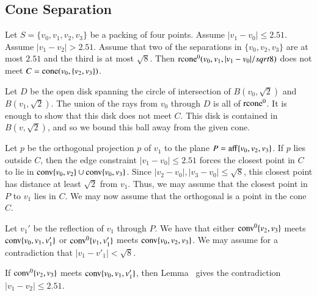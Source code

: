 \begin{tarskidata}
\begin{tarski}
\section{Cone Separation}

\begin{lemma}
Let $S=\{v_0,v_1,v_2,v_3\}$ be a packing of four points.
Assume $|v_1-v_0|\le 2.51$. Assume $|v_1-v_2|>2.51$.
Assume that two of the separations in $\{v_0,v_2,v_3\}$ are at
          most $2.51$ and the third is at most $\sqrt8$.
     Then ${\operatorname{rcone}}^0(v_0,v_1,|v_1-v_0|/sqrt8)$ does not meet
$C = {\operatorname{cone}}(v_0,\{v_2,v_3\})$.
\end{lemma}

\begin{proved}
Let $D$ be the open disk spanning the circle of intersection of
$B(v_0,\sqrt2)$ and $B(v_1,\sqrt2)$.  The union of the rays from $v_0$
through $D$ is all of ${\operatorname{rcone}}^0$.  It is enough to show that this
disk does not meet $C$.  This disk is contained in $B(v,\sqrt2)$,
and so we bound this ball away from the given cone.

Let $p$ be the orthogonal 
projection $p$ of $v_1$ to the plane $P={\operatorname{aff}}\{v_0,v_2,v_3\}$.
If $p$  lies outside $C$, then the
edge constraint $|v_1-v_0|\le 2.51$ forces the closest point in $C$ to
lie in ${\operatorname{conv}}\{v_0,v_2\}\cup{\operatorname{conv}}\{v_0,v_3\}$.  Since
$|v_2-v_0|,|v_3-v_0|\le\sqrt8$, this closest point has distance at least
$\sqrt2$ from $v_1$. Thus, we may assume that the closest point in
$P$ to $v_1$ lies in $C$.
We may now assume that the
orthogonal 
is a point in the
cone $C$.

Let $v_1'$ be the reflection of $v_1$ through $P$.  We
have that either ${\operatorname{conv}}^0\{v_2,v_3\}$ meets ${\operatorname{conv}}\{v_0,v_1,v'_1\}$ or
${\operatorname{conv}}^0\{v_1,v'_1\}$ meets ${\operatorname{conv}}\{v_0,v_2,v_3\}$.  We may assume for
a contradiction that $|v_1-v'_1|<\sqrt8$.

If ${\operatorname{conv}}^0\{v_2,v_3\}$ meets ${\operatorname{conv}}\{v_0,v_1,v'_1\}$, then
Lemma~ gives the contradiction
$|v_1-v_2|\le2.51$.


\end{proved}
\end{tarski}
\end{tarskidata}
